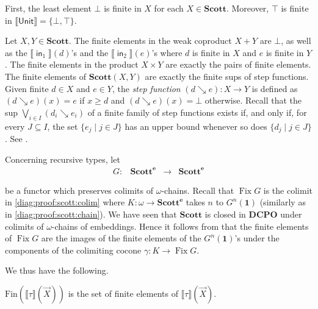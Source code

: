 \documentclass[%
  a4paper,
  UKenglish,
  cleveref,
  autoref,
  thm-restate,
  numberwithinsect,
]{lipics-v2021}
\newcommand\sle\subseteq
\newcommand\longto\longrightarrow
\newcommand\one{\mathbf{1}}	%
\newcommand\I[1]{\llbracket #1 \rrbracket} %
\newcommand\Fix{\mathop{\mathrm{Fix}}}
\newcommand\DCPO{\mathbf{DCPO}}
\newcommand\Scott{\mathbf{Scott}}
\newcommand\term[1]{\mathsf{#1}}
\newcommand\type[1]{\term{#1}}
\newcommand\inj{\mathop{\term{in}}}
\newcommand\Unit{\type{Unit}}
\newcommand\PT{\tau}		%
\newcommand\step{\searrow}
\newcommand\Fin{\mathrm{Fin}}	%
\newcommand\ep{{\mathbf{e}}}
\begin{document}
First, the least element $\bot$ is finite in $X$
for each $X \in \Scott$.
Moreover, $\top$ is finite in $\I\Unit = \{\bot,\top\}$.



Let $X,Y \in \Scott$.
The finite elements in the weak coproduct $X + Y$
are $\bot$,
as well as the $\I{\inj_1}(d)$'s 
and the $\I{\inj_2}(e)$'s
where $d$ is finite in $X$ and $e$ is finite in $Y$.
%
The finite elements in the product $X \times Y$
are exactly the pairs of finite elements.
The finite elements of $\Scott(X,Y)$ are exactly the finite sups of step functions.
Given finite $d \in X$ and $e \in Y$,
the \emph{step function} $(d \step e) \colon X \to Y$
is defined as $(d \step e)(x) = e$ if $x \geq d$ and
$(d \step e)(x)= \bot$ otherwise.
Recall that the sup $\bigvee_{i \in I}(d_i \step e_i)$ of 
a finite family of step functions exists
if, and only if,
for every $J \sle I$, the set $\{e_j \mid j \in J\}$ has an upper bound
whenever so does $\{d_j \mid j \in J\}$.
See \cite[Theorem 1.4.12]{ac98book}.


Concerning recursive types, let 
\[
\begin{array}{*{4}{l}}
  G \colon
& \Scott^\ep
& \longto
& \Scott^\ep
\end{array}
\]

\noindent
be a functor which preserves colimits of $\omega$-chains.
Recall that $\Fix G$ is the colimit in \eqref{diag:proof:scott:colim}
where $K \colon \omega \to \Scott^\ep$
takes $n$ to $G^n(\one)$
(similarly as in \eqref{diag:proof:scott:chain}).
We have seen that $\Scott$ is closed in $\DCPO$
under colimits of $\omega$-chains of embeddings.
Hence it follows from \cite[Theorem 3.3.11]{aj95chapter}
that the finite elements of $\Fix G$
are the images of the finite elements of the $G^n(\one)$'s
under the components of the colimiting cocone
$\gamma \colon K \to \Fix G$.

We thus have the following.

\begin{proposition}
\label{prop:proof:scott:fin}
$\Fin(\I\PT(\vec X))$ is the set of finite elements of $\I\PT(\vec X)$.
\end{proposition}
\end{document}
